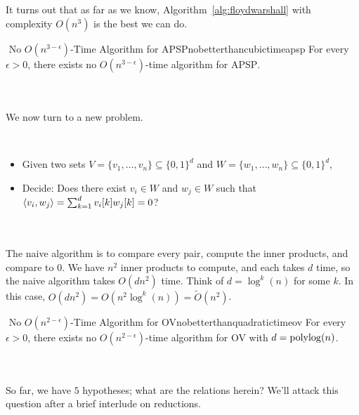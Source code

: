         \vphantom
        \\
        \\
        It turns out that as far as we know, Algorithm~\ref{alg:floydwarshall} with complexity \(O(n^3)\) is the best we can do.
        \begin{hypothesis}{\Stop\,\,No \(O(n^{3-\epsilon})\)-Time Algorithm for \textsc{APSP}}{nobetterthancubictimeapsp}
            For every \(\epsilon>0\), there exists no \(O(n^{3-\epsilon})\)-time algorithm for \textsc{APSP}.
        \end{hypothesis}
        \pagebreak
        \vphantom
        \\
        \\
        We now turn to a new problem.
        \begin{compprob} \label{prob:ov}
            \vphantom
            \\
            \begin{itemize}
                \item Given two sets \(V=\{v_1,\ldots,v_n\}\subseteq\{0,1\}^d\) and \(W=\{w_1,\ldots,w_n\}\subseteq\{0,1\}^d\),
                \item Decide: Does there exist \(v_i\in W\) and \(w_j\in W\) such that \(\left\langle v_i,w_j\right\rangle=\sum_{k=1}^d v_i[k]w_j[k]=0\)?
            \end{itemize}
        \end{compprob}
        \vphantom
        \\
        \\
        The naive algorithm is to compare every pair, compute the inner products, and compare to \(0\). We have \(n^2\) inner products to compute, and each takes \(d\) time, so the naive algorithm takes \(O(dn^2)\) time. Think of \(d=\log^k(n)\) for some \(k\). In this case, \(O(dn^2)=O(n^2\log^k(n))=\tilde{O}(n^2)\).
        \begin{hypothesis}{\Stop\,\,No \(O(n^{2-\epsilon})\)-Time Algorithm for \textsc{OV}}{nobetterthanquadratictimeov}
            For every \(\epsilon>0\), there exists no \(O(n^{2-\epsilon})\)-time algorithm for \textsc{OV} with \(d=\operatorname{polylog}(n)\).
        \end{hypothesis}
        \vphantom
        \\
        \\
        So far, we have \(5\) hypotheses; what are the relations herein? We'll attack this question after a brief interlude on reductions.
        \\
